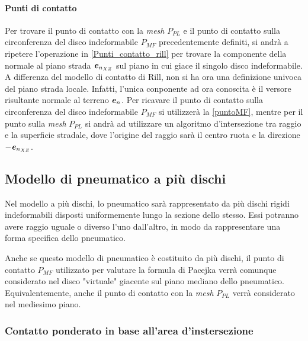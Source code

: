 \paragraph{Punti di contatto}
Per trovare il punto di contatto con la \textit{mesh} $P_{PL}$ e il punto di contatto sulla circonferenza del disco indeformabile $P_{MF}$ precedentemente definiti, si andrà a ripetere l'operazione in \ref{Punti_contatto_rill} per trovare la componente della normale al piano strada $\textbf{\textit{e}}_{n_{XZ}}$ sul piano in cui giace il singolo disco indeformabile. A differenza del modello di contatto di Rill, non si ha ora una definizione univoca del piano strada locale. Infatti, l'unica conponente ad ora conoscita è il versore risultante normale al terreno $\textbf{\textit{e}}_n$. Per ricavare il punto di contatto sulla circonferenza del disco indeformabile $P_{MF}$ si utilizzerà la \eqref{puntoMF}, mentre per il punto sulla \textit{mesh} $P_{PL}$ si andrà ad utilizzare un algoritmo d'intersezione tra raggio e la superficie stradale, dove l'origine del raggio sarà il centro ruota e la direzione $-\textbf{\textit{e}}_{n_{XZ}}$.
%
\subsection{Modello di pneumatico a più dischi}
%
Nel modello a più dischi, lo pneumatico sarà rappresentato da più dischi rigidi indeformabili disposti uniformemente lungo la sezione dello stesso. Essi potranno avere raggio uguale o diverso l'uno dall'altro, in modo da rappresentare una forma specifica dello pneumatico.


Anche se questo modello di pneumatico è costituito da più dischi, il punto di contatto $P_{MF}$ utilizzato per valutare la formula di Pacejka verrà comunque considerato nel disco "virtuale" giacente sul piano mediano dello pneumatico. Equivalentemente, anche il punto di contatto con la \textit{mesh} $P_{PL}$ verrà considerato nel mediesimo piano.
%
\subsubsection{Contatto ponderato in base all'area d'instersezione}
